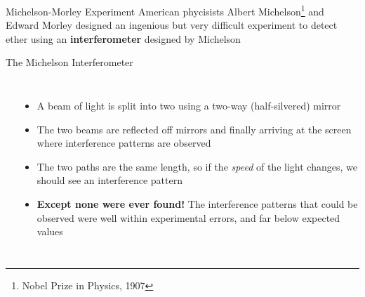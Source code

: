 \documentclass[12pt,compress,aspectratio=169]{beamer}
\begin{document}
\begin{frame}{Michelson-Morley Experiment}
  American phycisists Albert Michelson\footnote{Nobel Prize in Physics, 1907}
  and Edward Morley designed an ingenious but very difficult experiment to
  detect ether using an \textbf{interferometer} designed by Michelson
  \begin{center}
  \end{center}
\end{frame}



\begin{frame}{The Michelson Interferometer}
  \begin{columns}
    \begin{center}
    \end{center}

    \begin{itemize}
    \item A beam of light is split into two using a two-way (half-silvered)
      mirror
    \item The two beams are reflected off mirrors and finally arriving at the
      screen where interference patterns are observed
    \item The two paths are the same length, so if the \emph{speed} of the light
      changes, we should see an interference pattern
    \item\textbf{Except none were ever found!} The interference patterns that
      could be observed were well within experimental errors, and far below
      expected values
    \end{itemize}
  \end{columns}
\end{frame}
\end{document}
